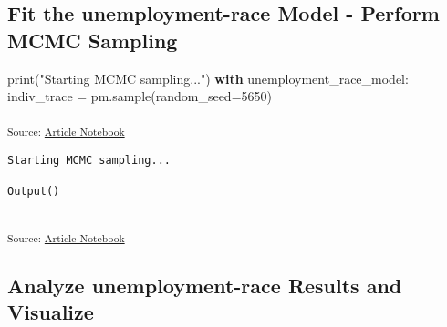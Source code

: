 \documentclass[
]{agujournal2019}
\newenvironment{Shaded}{\begin{snugshade}}{\end{snugshade}}
\newcommand{\BuiltInTok}[1]{\textcolor[rgb]{0.00,0.23,0.31}{#1}}
\newcommand{\ControlFlowTok}[1]{\textcolor[rgb]{0.00,0.23,0.31}{\textbf{#1}}}
\newcommand{\DecValTok}[1]{\textcolor[rgb]{0.68,0.00,0.00}{#1}}
\newcommand{\NormalTok}[1]{\textcolor[rgb]{0.00,0.23,0.31}{#1}}
\newcommand{\OperatorTok}[1]{\textcolor[rgb]{0.37,0.37,0.37}{#1}}
\newcommand{\StringTok}[1]{\textcolor[rgb]{0.13,0.47,0.30}{#1}}
\begin{document}
\subsection{Fit the unemployment-race Model - Perform MCMC
Sampling}\label{fit-the-unemployment-race-model---perform-mcmc-sampling}

\begin{Shaded}
\begin{Highlighting}[]
\BuiltInTok{print}\NormalTok{(}\StringTok{"Starting MCMC sampling..."}\NormalTok{)}
\ControlFlowTok{with}\NormalTok{ unemployment\_race\_model:}
\NormalTok{    indiv\_trace }\OperatorTok{=}\NormalTok{ pm.sample(random\_seed}\OperatorTok{=}\DecValTok{5650}\NormalTok{)}
\end{Highlighting}
\end{Shaded}

\textsubscript{Source:
\href{https://mw1296.github.io/dsan5650_social_causal_inference/index.qmd.html}{Article
Notebook}}

\begin{verbatim}
Starting MCMC sampling...
\end{verbatim}

\begin{verbatim}
Output()
\end{verbatim}

\begin{verbatim}
\end{verbatim}

\textsubscript{Source:
\href{https://mw1296.github.io/dsan5650_social_causal_inference/index.qmd.html}{Article
Notebook}}

\subsection{Analyze unemployment-race Results and
Visualize}\label{analyze-unemployment-race-results-and-visualize}
\end{document}

